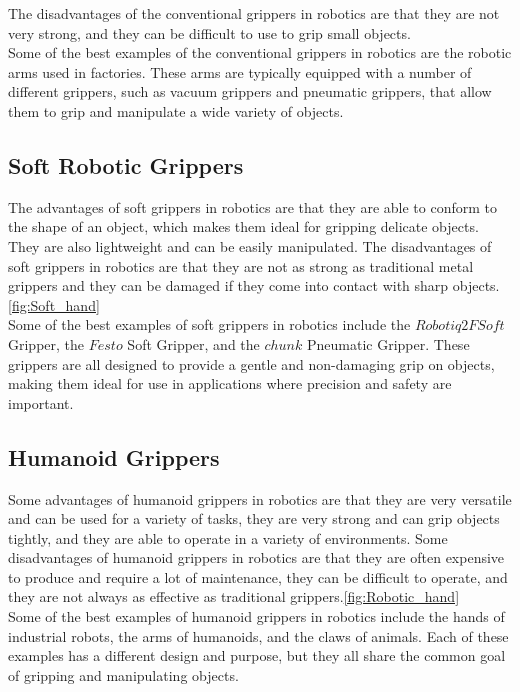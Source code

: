 \documentclass[12pt, twoside]{report}
\begin{document}
The disadvantages of the conventional grippers in robotics are that they are not very strong, and they can be difficult to use to grip small objects.\\

Some of the best examples of the conventional grippers in robotics are the robotic arms used in factories. These arms are typically equipped with a number of different grippers, such as vacuum grippers and pneumatic grippers, that allow them to grip and manipulate a wide variety of objects.
\subsection{Soft Robotic Grippers}

The advantages of soft grippers in robotics are that they are able to conform to the shape of an object, which makes them ideal for gripping delicate objects. They are also lightweight and can be easily manipulated. The disadvantages of soft grippers in robotics are that they are not as strong as traditional metal grippers and they can be damaged if they come into contact with sharp objects. \ref{fig:Soft_hand}\\

Some of the best examples of soft grippers in robotics include the $Robotiq 2F Soft$ Gripper, the $Festo$ Soft Gripper, and the $chunk$ Pneumatic Gripper. These grippers are all designed to provide a gentle and non-damaging grip on objects, making them ideal for use in applications where precision and safety are important.

\subsection{Humanoid Grippers}
Some advantages of humanoid grippers in robotics are that they are very versatile and can be used for a variety of tasks, they are very strong and can grip objects tightly, and they are able to operate in a variety of environments. Some disadvantages of humanoid grippers in robotics are that they are often expensive to produce and require a lot of maintenance, they can be difficult to operate, and they are not always as effective as traditional grippers.\ref{fig:Robotic_hand}\\
Some of the best examples of humanoid grippers in robotics include the hands of industrial robots, the arms of humanoids, and the claws of animals. Each of these examples has a different design and purpose, but they all share the common goal of gripping and manipulating objects.
\end{document}
